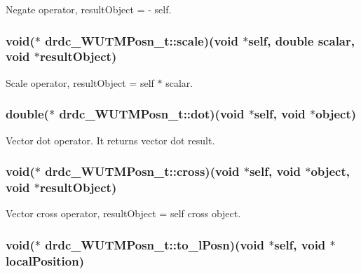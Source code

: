 Negate operator, resultObject = - self. 

\hypertarget{structdrdc__WUTMPosn__t_e7c9b83d1c882ef805af39242a160d2b}{
\subsubsection[scale]{\setlength{\rightskip}{0pt plus 5cm}void($\ast$ {\bf drdc\_\-WUTMPosn\_\-t::scale})(void $\ast$self, double scalar, void $\ast$resultObject)}}
\label{structdrdc__WUTMPosn__t_e7c9b83d1c882ef805af39242a160d2b}


Scale operator, resultObject = self $\ast$ scalar. 

\hypertarget{structdrdc__WUTMPosn__t_152667cc56a1c8824d624f45028460f6}{
\subsubsection[dot]{\setlength{\rightskip}{0pt plus 5cm}double($\ast$ {\bf drdc\_\-WUTMPosn\_\-t::dot})(void $\ast$self, void $\ast$object)}}
\label{structdrdc__WUTMPosn__t_152667cc56a1c8824d624f45028460f6}


Vector dot operator. It returns vector dot result. 

\hypertarget{structdrdc__WUTMPosn__t_ecfb44e580963c488c8c48680aca5c05}{
\subsubsection[cross]{\setlength{\rightskip}{0pt plus 5cm}void($\ast$ {\bf drdc\_\-WUTMPosn\_\-t::cross})(void $\ast$self, void $\ast$object, void $\ast$resultObject)}}
\label{structdrdc__WUTMPosn__t_ecfb44e580963c488c8c48680aca5c05}


Vector cross operator, resultObject = self cross object. 

\hypertarget{structdrdc__WUTMPosn__t_7175dd5c4ea307a45221bdf70c1973a3}{
\subsubsection[to\_\-lPosn]{\setlength{\rightskip}{0pt plus 5cm}void($\ast$ {\bf drdc\_\-WUTMPosn\_\-t::to\_\-lPosn})(void $\ast$self, void $\ast$localPosition)}}
\label{structdrdc__WUTMPosn__t_7175dd5c4ea307a45221bdf70c1973a3}


